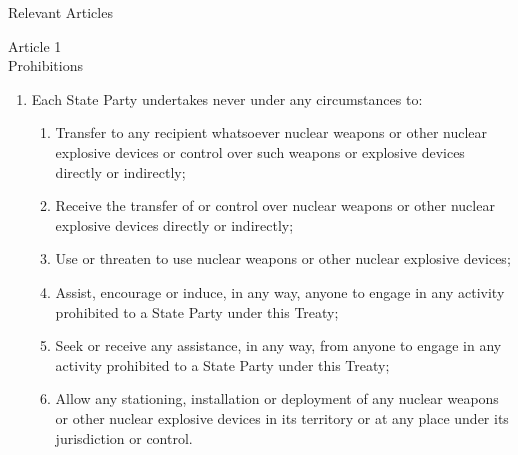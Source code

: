 \documentclass[presentation]{beamer}
\begin{document}
\begin{frame}[label={sec:org3f505f6}]{Relevant Articles}
\begin{tcolorbox}[center, width=0.8\textwidth]
\scriptsize
\centering
Article 1\\
Prohibitions
\tinyscriptsize
\begin{enumerate}
\item Each State Party undertakes never under any circumstances to:

\begin{enumerate}
\tinyscriptsize
\setcounter{enumii}{1}\item \textcolor<1-3>{gray!20}{Transfer to any recipient whatsoever nuclear weapons or other nuclear explosive devices or control over such weapons or explosive devices directly or indirectly;}
\setcounter{enumii}{2}\item \textcolor<1-3>{gray!20}{Receive the transfer of or control over nuclear weapons or other nuclear explosive devices directly or indirectly;}
\setcounter{enumii}{3}\item \textcolor<1>{gray!20}{Use or threaten to use nuclear weapons or other nuclear explosive devices;}
\setcounter{enumii}{4}\item \textcolor<1-2>{gray!20}{Assist, encourage or induce, in any way, anyone to engage in any activity prohibited to a State Party under this Treaty;}
\setcounter{enumii}{5}\item \textcolor<1-2>{gray!20}{Seek or receive any assistance, in any way, from anyone to engage in any activity prohibited to a State Party under this Treaty;}
\setcounter{enumii}{6}\item Allow any stationing, installation or deployment of any nuclear weapons or other nuclear explosive devices in its territory or at any place under its jurisdiction or control.
\end{enumerate}
\end{enumerate}
\end{tcolorbox}
\end{frame}
\end{document}
